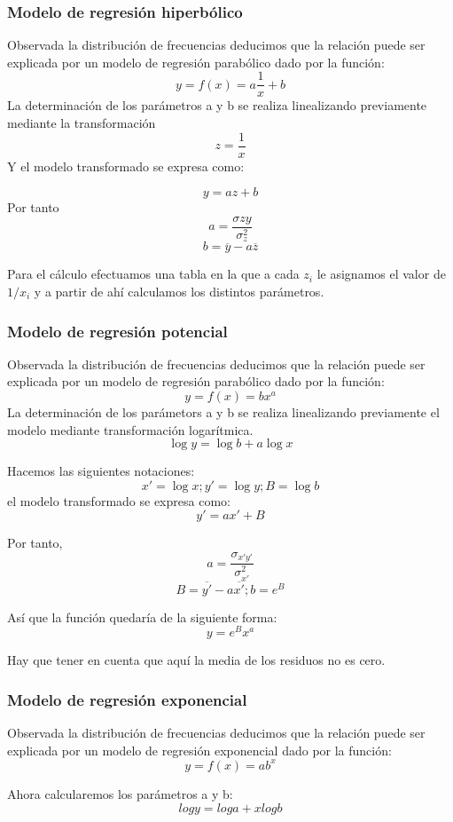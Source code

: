 \documentclass{article}
\begin{document}
\subsubsection{Modelo de regresión hiperbólico}

Observada la distribución de frecuencias deducimos que la relación puede ser explicada por un modelo de regresión parabólico dado por la función:
$$ y= f(x) = a\frac{1}{x} + b $$
La determinación de los parámetros a y b se realiza linealizando previamente mediante la transformación 
$$ z = \frac{1}{x} $$
Y el modelo transformado se expresa como:

$$ y = az +b $$
Por tanto $$ a = \frac{\sigma{zy} }{\sigma_{z}^2} $$ 
$$ b = \overline{y} - a \overline{z} $$

Para el cálculo efectuamos una tabla en la que a cada $z_i$ le asignamos el valor de $1/x_i$ y a partir de ahí calculamos los distintos parámetros.

\subsubsection{Modelo de regresión potencial}
	Observada la distribución de frecuencias deducimos que la relación puede ser explicada por un modelo de regresión parabólico dado por la función:
$$ y = f(x) = bx^a $$
	La determinación de los parámetors a y b se realiza linealizando previamente el modelo mediante transformación logarítmica.
	$$ \log y = \log b + a\log x $$
	
	Hacemos las siguientes notaciones:
$$x' = \log x; y' = \log y ; B = \log b $$
	el modelo transformado se expresa como:
$$y' = ax' + B $$
	
	Por tanto,
	$$ a = \frac{\sigma_{x'y'} }{\sigma_{x'}^2}$$
	$$ B = \overline{y'} - a\overline{x'} ; b = e^{B} $$
	
	Así que la función quedaría de la siguiente forma:
	$$ y = e^{B}x^{a} $$
	
	Hay que tener en cuenta que aquí la media de los residuos no es cero.
	
\subsubsection{Modelo de regresión exponencial}
	Observada la distribución de frecuencias deducimos que la relación puede ser explicada por un modelo de regresión exponencial dado por la función:
$$ y = f(x) = ab^{x} $$

	Ahora calcularemos los parámetros a y b:
	$$ log y = log a + xlog b $$
	
\end{document}
